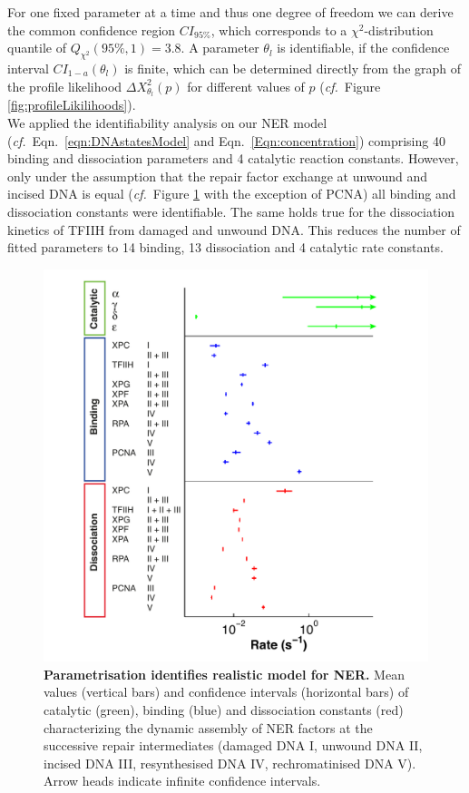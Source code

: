 For one fixed parameter at a time and thus one degree of freedom we can derive the common confidence region $CI_{95\%}$, which corresponds to a $\chi^{2}$-distribution quantile of $Q_{\chi^{2}}(95\%,1)=3.8$. A parameter $\theta_l$ is identifiable, if the confidence interval $CI_{1-a}(\theta_l)$ is finite, which can be determined directly from the graph of the profile likelihood $\Delta X_{\theta_l}^2(p)$ for different values of $p$ (\textit{cf.}\ Figure \ref{fig:profileLikilihoods}).\\ 
We applied the identifiability analysis on our NER model (\textit{cf.}\ Eqn.\ \ref{eqn:DNAstatesModel} and Eqn.\ \ref{Eqn:concentration}) comprising 40 binding and dissociation parameters and 4 catalytic reaction constants. However, only under the assumption that the repair factor exchange at unwound and incised DNA is equal (\textit{cf.}\ Figure \ref{fig:PLE_NER_overview} with the exception of PCNA) all binding and dissociation constants were identifiable. The same holds true for the dissociation kinetics of TFIIH from damaged and unwound DNA. This reduces the number of fitted parameters to 14 binding, 13 dissociation and 4 catalytic rate constants.
\begin{figure}[htbp]
	\begin{center}
		\includegraphics[width=1\textwidth]{Abbildungen/figure2_9.pdf}
		\caption{\textbf{Parametrisation identifies realistic model for NER.} Mean values (vertical bars) and confidence intervals (horizontal bars) of catalytic (green), binding (blue) and dissociation constants (red) characterizing the dynamic assembly of NER factors at the successive repair intermediates (damaged DNA I, unwound DNA II, incised DNA III, resynthesised DNA IV, rechromatinised DNA V). Arrow heads indicate infinite confidence intervals.}
		\label{fig:PLE_NER_overview}
	\end{center}
\end{figure}

